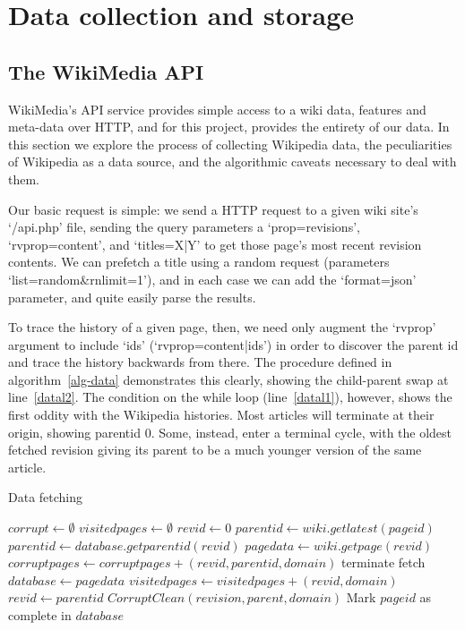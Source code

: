 \section{Data collection and storage}
\subsection*{The WikiMedia API}
WikiMedia's API service provides simple access to a wiki data,
features and meta-data over HTTP,\cite{wiki-api} and for this project,
provides the entirety of our data. In this section we explore the
process of collecting Wikipedia data, the peculiarities of Wikipedia
as a data source, and the algorithmic caveats necessary to deal with
them.

Our basic request is simple: we send a HTTP request to a given wiki
site's `/api.php' file, sending the query parameters a
`prop=revisions', `rvprop=content', and `titles=X|Y' to get those
page's most recent revision contents. We can prefetch a title using a
random request (parameters `list=random\&rnlimit=1'), and in each case
we can add the `format=json' parameter, and quite easily parse the
results. 

To trace the history of a given page, then, we need only augment the
`rvprop' argument to include `ids' (`rvprop=content|ids') in order to
discover the parent id and trace the history backwards from there. The
procedure defined in algorithm~\ref{alg-data} demonstrates this
clearly, showing the child-parent swap at line~\ref{datal2}. The
condition on the while loop (line~\ref{datal1}), however, shows the
first oddity with the Wikipedia histories. Most articles will
terminate at their origin, showing parentid 0. Some, instead, enter a
terminal cycle, with the oldest fetched revision giving its parent to
be a much younger version of the same article. 

\begin{algorithm}
  \caption{Data fetching}\label{alg-data}
  \begin{algorithmic}
    \State $corrupt \gets \emptyset$
    \State $visitedpages \gets \emptyset$
    \State $revid \gets 0$
    \State $parentid \gets wiki.getlatest(pageid)$
    \label{datal1} 
    \State $parentid \gets database.getparentid(revid)$
    \Else
    \State $pagedata \gets wiki.getpage(revid)$
    \EndIf
    \label{datal3}
    \State $corruptpages \gets corruptpages + (revid, parentid, domain)$
    \Else
    \State terminate fetch
    \EndIf
    \Else
    \State $database \gets page data$
    \EndIf
    \State $visitedpages \gets visitedpages + (revid, domain)$
    \State $revid \gets parentid$\label{datal2}
    \EndWhile
    \State $CorruptClean(revision, parent, domain)$
    \EndFor
    \State Mark $pageid$ as complete in $database$
    \EndProcedure
  \end{algorithmic}
\end{algorithm}

